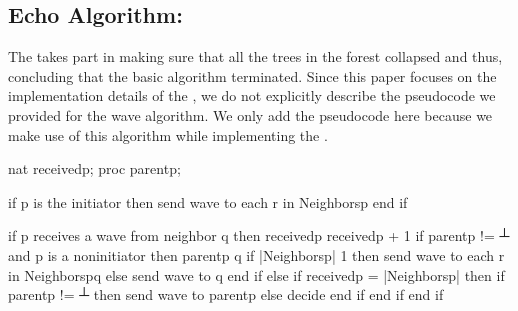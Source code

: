 \documentclass[letterpaper,10pt,english]{sphinxmanual}
\begin{document}
\subsection{Echo Algorithm:}
\label{\detokenize{docs/ShavitFrancez/algorithm:echo-algorithm}}
\sphinxAtStartPar
The {\hyperref[\detokenize{docs/ShavitFrancez/algorithm:echoalgorithm}]{}}  takes part in making sure that all the trees in the forest collapsed and thus, concluding that the basic algorithm terminated. Since this paper focuses on the implementation details of the {\hyperref[\detokenize{docs/ShavitFrancez/algorithm:shavitfrancezterminationdetectionalgorithm}]{}}, we do not explicitly describe the pseudocode we provided for the wave algorithm. We only add the pseudocode here because we make use of this algorithm while implementing the {\hyperref[\detokenize{docs/ShavitFrancez/algorithm:shavitfrancezterminationdetectionalgorithm}]{}}.
\def\sphinxLiteralBlockLabel{\label{\detokenize{docs/ShavitFrancez/algorithm:id13}}\label{\detokenize{docs/ShavitFrancez/algorithm:echoalgorithm}}}
\begin{sphinxVerbatim}[commandchars=\\\{\},numbers=left,firstnumber=1,stepnumber=1]
nat received\PYGZlt{}p\PYGZgt{};
proc parent\PYGZlt{}p\PYGZgt{};

if p is the initiator then
   send \PYGZlt{}wave\PYGZgt{} to each r in Neighbors\PYGZlt{}p\PYGZgt{}
end if

if p receives a \PYGZlt{}wave\PYGZgt{} from neighbor q then
   received\PYGZlt{}p\PYGZgt{} \PYGZlt{}\PYGZhy{} received\PYGZlt{}p\PYGZgt{} + 1
   if parent\PYGZlt{}p\PYGZgt{} != ┴ and p is a non\PYGZhy{}initiator then
       parent\PYGZlt{}p\PYGZgt{} \PYGZlt{}\PYGZhy{} q
       if |Neighbors\PYGZlt{}p\PYGZgt{}| \PYGZgt{} 1 then
          send \PYGZlt{}wave\PYGZgt{} to each r in Neighbors\PYGZlt{}p\PYGZgt{}\PYGZbs{}\PYGZob{}q\PYGZcb{}
       else
          send \PYGZlt{}wave\PYGZgt{} to q
       end if
   else if received\PYGZlt{}p\PYGZgt{} = |Neighbors\PYGZlt{}p\PYGZgt{}| then
       if parent\PYGZlt{}p\PYGZgt{} != ┴ then
          send \PYGZlt{}wave\PYGZgt{} to parent\PYGZlt{}p\PYGZgt{}
       else
          decide
       end if
   end if
end if
\end{sphinxVerbatim}
\end{document}
